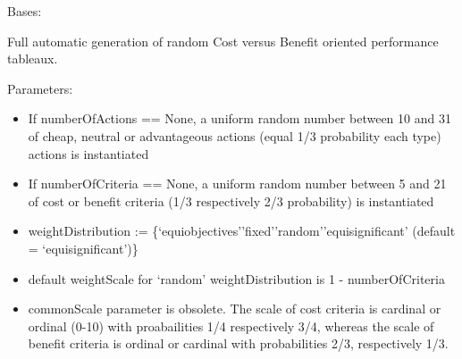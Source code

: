 \documentclass[letterpaper,10pt,english]{sphinxmanual}
\begin{document}
\begin{fulllineitems}

\begin{fulllineitems}
\label{techDoc:randomPerfTabs.Random3ObjectivesPerformanceTableau.showObjectives}
\end{fulllineitems}


\end{fulllineitems}


\begin{fulllineitems}
\label{techDoc:randomPerfTabs.RandomCBPerformanceTableau}
Bases: {\hyperref[techDoc:perfTabs.PerformanceTableau]{\emph{}}}

Full automatic generation of random
Cost versus Benefit oriented performance tableaux.

Parameters:
\begin{itemize}
\item {} 
If numberOfActions == None, a uniform random number between 10 and 31 of cheap, neutral or advantageous actions (equal 1/3 probability each type) actions is instantiated

\item {} 
If numberOfCriteria == None, a uniform random number between 5 and 21 of cost or benefit criteria (1/3 respectively 2/3 probability) is instantiated

\item {} 
weightDistribution := \{`equiobjectives'\textbar{}'fixed'\textbar{}'random'\textbar{}'equisignificant' (default = `equisignificant')\}

\item {} 
default weightScale for `random' weightDistribution is 1 - numberOfCriteria

\item {} 
commonScale parameter is obsolete. The scale of cost criteria is cardinal or ordinal (0-10) with proabailities 1/4 respectively 3/4, whereas the scale of benefit criteria is ordinal or cardinal with probabilities 2/3, respectively 1/3.


\end{itemize}
\end{fulllineitems}
\end{document}
